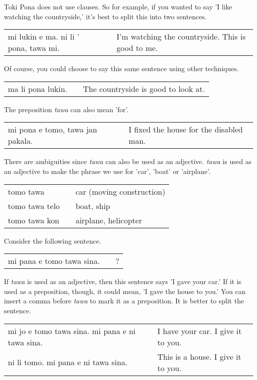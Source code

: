 %
Toki Pona does not use clauses. 
So for example, if you wanted to say 'I like watching the countryside,' it's best to split this into two sentences.

\begin{supertabular}{p{5,5cm}|ll}
mi lukin e ma. ni li ' pona, tawa mi. && I'm watching the countryside. This is good to me.\\
\end{supertabular} 

Of course, you could choose to say this same sentence using other techniques. 

\begin{supertabular}{p{5,5cm}|ll}
ma li pona lukin. && The countryside is good to look at. \\
\end{supertabular} 

%
The preposition \textit{tawa} can also mean 'for'.
 
\begin{supertabular}{p{5,5cm}|ll}
mi pona e tomo, tawa jan pakala. && I fixed the house for the disabled man. \\
\end{supertabular} 

% 
There are ambiguities since \textit{tawa} can also be used as an adjective. 
\textit{tawa} is used as an adjective to make the phrase we use for 'car', 'boat' or 'airplane'.

\begin{supertabular}{p{5,5cm}|ll}
tomo tawa && car (moving construction) \\
tomo tawa telo && boat, ship \\
tomo tawa kon && airplane, helicopter \\
\end{supertabular} 
%

Consider the following sentence.

\begin{supertabular}{p{5,5cm}|ll}
mi pana e tomo tawa sina. && ? \\   %
\end{supertabular} 

If \textit{tawa} is used as an adjective, then this sentence says 'I gave your car.' 
If it is used as a preposition, though, it could mean, 'I gave the house to you.' 
You can insert a comma before \textit{tawa} to mark it as a preposition. 
It is better to split the sentence. 

\begin{supertabular}{p{5,5cm}|ll}
mi jo e tomo tawa sina. mi pana e ni tawa sina. && I have your car. I give it to you. \\
ni li tomo. mi pana e ni tawa sina. && This is a house. I give it to you. \\
\end{supertabular} 

